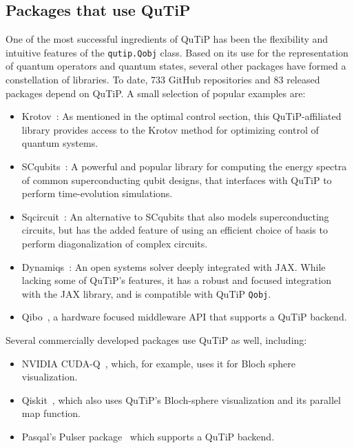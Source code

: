 \documentclass[preprint,3p,sort&compress]{elsarticle}
\def\code#1{\texttt{#1}}
\begin{document}



\subsection{Packages that use QuTiP}
One of the most successful ingredients of QuTiP has been the flexibility and intuitive features of the \code{qutip.Qobj} class. Based on its use for the representation of quantum operators and quantum states, several other packages have formed a constellation of libraries.  To date, 733 GitHub repositories and 83 released packages depend on QuTiP.  A small selection of popular examples are:
\begin{itemize}
\item Krotov~\cite{Goerz_2019_SciPost}: As mentioned in the optimal control section, this QuTiP-affiliated library provides access to the Krotov method for optimizing control of quantum systems. 
\item SCqubits~\cite{Groszkowski2021}: A powerful and popular library for computing the energy spectra of common superconducting qubit designs, that interfaces with QuTiP to perform time-evolution simulations.
\item Sqcircuit~\cite{Rajabzadeh2023}: An alternative to SCqubits that also models superconducting circuits, but has the added feature of using an efficient choice of basis to perform diagonalization of complex circuits.
\item Dynamiqs~\cite{guilmin2024dynamiqs}: An open systems solver deeply integrated with JAX.  While lacking some of QuTiP's features, it has a robust and focused integration with the JAX library, and is compatible with QuTiP \code{Qobj}.
\item Qibo~\cite{qibo}, a hardware focused middleware API that supports a QuTiP backend.
\end{itemize}

Several commercially developed packages use QuTiP as well, including:

\begin{itemize}
    \item  NVIDIA CUDA-Q~\cite{cudaq}, which, for example, uses it for Bloch sphere visualization.
\item Qiskit~\cite{2024qiskit}, which also uses QuTiP's Bloch-sphere visualization and its parallel map function.
\item Pasqal's Pulser package~\cite{pulser} which supports a QuTiP backend.
\end{itemize}
\end{document}
